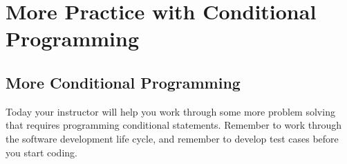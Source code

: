 
\chapter{More Practice with Conditional Programming}
\label{day:movie-ticket}


\section{More Conditional Programming}

Today your instructor will help you work through some more problem solving that requires programming conditional statements.  Remember to work through the  software development life cycle, and remember to develop test cases before you start coding.